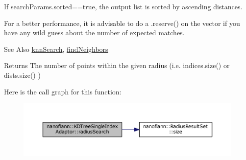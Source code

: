 If search\-Params.\-sorted==true, the output list is sorted by ascending distances.

For a better performance, it is advisable to do a .reserve() on the vector if you have any wild guess about the number of expected matches.

\begin{DoxySeeAlso}{See Also}
\hyperlink{classnanoflann_1_1_k_d_tree_single_index_adaptor_acf404828507288cf6302ced33bdc45bb}{knn\-Search}, \hyperlink{classnanoflann_1_1_k_d_tree_single_index_adaptor_a1b73cef78437060cec2629810608d63e}{find\-Neighbors} 
\end{DoxySeeAlso}
\begin{DoxyReturn}{Returns}
The number of points within the given radius (i.\-e. indices.\-size() or dists.\-size() ) 
\end{DoxyReturn}


Here is the call graph for this function\-:
\nopagebreak
\begin{figure}[H]
\begin{center}
\leavevmode
\includegraphics[width=350pt]{classnanoflann_1_1_k_d_tree_single_index_adaptor_afcaab7169b54103fcb37c6ad02ec44f7_cgraph}
\end{center}
\end{figure}


